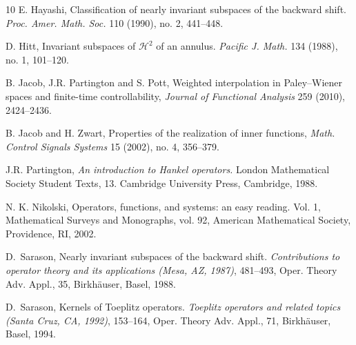 \documentclass[11pt]{article}
\numberwithin{equation}{section}
\begin{document}
\begin{thebibliography}{10}
E. Hayashi,   Classification of nearly invariant subspaces of the backward shift. {\em Proc. Amer. Math. Soc.} 110 (1990), no. 2, 441--448.


D. Hitt,
Invariant subspaces of ${\mathcal H}^2$ of an annulus. {\em Pacific J. Math.} 134 (1988), no. 1, 101--120.

B. Jacob, J.R. Partington and S. Pott,
Weighted interpolation in Paley--Wiener spaces and
finite-time controllability,
{\em Journal of Functional Analysis\/} 259 (2010), 2424--2436.

B. Jacob and H. Zwart,
Properties of the realization of inner functions,
{\em Math. Control Signals Systems\/} 15 (2002), no. 4,
356--379.

J.R. Partington,
{\em An introduction to Hankel operators. } London Mathematical Society Student Texts, 13. Cambridge University Press, Cambridge, 1988.

N. K. Nikolski, Operators, functions, and systems: an easy reading. Vol. 1, Mathematical Surveys and Monographs, vol. 92, American Mathematical Society, Providence, RI, 2002. 

D.~Sarason,  Nearly invariant subspaces of the backward shift. {\em Contributions to operator theory and its applications (Mesa, AZ, 1987)}, 481--493,
Oper. Theory Adv. Appl., 35, Birkh\"auser, Basel, 1988.

D.~Sarason,  Kernels of Toeplitz operators. {\em Toeplitz operators and related topics (Santa Cruz, CA, 1992)}, 153--164, Oper. Theory Adv. Appl., 71, Birkh\"auser, Basel, 1994.


\end{thebibliography}
\end{document}
